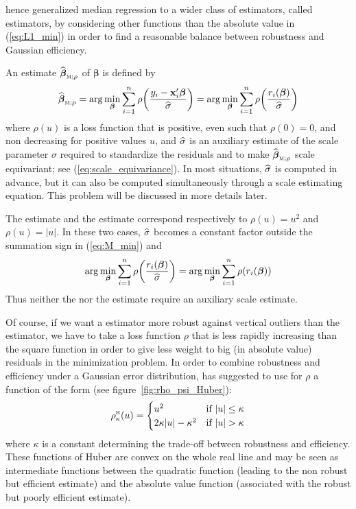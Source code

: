\citet{huber64} hence generalized median regression to a wider class of
estimators, called  estimators, by considering other functions than
the absolute value in (\ref{eq:L1_min}) in order to find a reasonable balance
between robustness and Gaussian efficiency.

An  estimate $\sthat{\boldsymbol\beta}_{\stsc{M};\rho}$ of
$\boldsymbol\beta$ is defined by
%
\begin{equation}
    \label{eq:M_min}
    \sthat{\boldsymbol\beta}_{\stsc{M};\rho} 
        = \arg\min_{\boldsymbol\beta}\sum_{i=1}^{n} 
            \rho\left(\frac{y_{i} - \stvec{x}_{i}'\boldsymbol\beta}{\sthat{\sigma}}\right)
        = \arg\min_{\boldsymbol\beta}\sum_{i=1}^{n}
            \rho\left(\frac{r_{i}(\boldsymbol\beta)}{\sthat{\sigma}}\right)
\end{equation}
%
where $\rho(u)$ is a loss function that is positive, even such that $\rho(0) =
0$, and non decreasing for positive values $u$, and $\widehat{\sigma}$ is an
auxiliary estimate of the scale parameter $\sigma$ required to standardize the
residuals and to make $\sthat{\boldsymbol\beta}_{\stsc{M};\rho}$ scale
equivariant; see (\ref{eq:scale_equivariance}). In most situations,
$\widehat{\sigma}$ is computed in advance, but it can also be computed
simultaneously through a scale  estimating equation. This problem will
be discussed in more details later.

\begin{stremark}
The  estimate and the  estimate correspond respectively to
$\rho(u) = u^{2}$ and $\rho(u) = |u|$. In these two cases, $\widehat{\sigma}$
becomes a constant factor outside the summation sign in (\ref{eq:M_min}) and
\[
    \arg\min_{\boldsymbol\beta} \sum_{i=1}^{n} \rho\left(\frac{r_{i}(\boldsymbol\beta)}{\sthat{\sigma}}\right)
    = \arg\min_{\boldsymbol\beta}\sum_{i=1}^{n}\rho(r_{i}(\boldsymbol\beta))
\]
Thus neither the  nor the  estimate require an auxiliary
scale estimate.
\end{stremark}

Of course, if we want a  estimator more robust against vertical
outliers than the  estimator, we have to take a loss function $\rho$
that is less rapidly increasing than the square function in order to give less
weight to big (in absolute value) residuals in the minimization problem. In
order to combine robustness and efficiency under a Gaussian error distribution,
\citet{huber64} has suggested to use for $\rho$ a function of the form (see
figure~\ref{fig:rho_psi_Huber}):
\[
    \rho_{\kappa}^{\stsc{H}}(u) = 
    \begin{cases}
        u^{2}                    & \text{if $|u| \leq \kappa$}\\
        2\kappa |u| - \kappa^{2} & \text{if $|u| > \kappa$}
    \end{cases}
\]
where $\kappa$ is a constant determining the trade-off between robustness and
efficiency. These functions of Huber are convex on the whole real line and may
be seen as intermediate functions between the quadratic function (leading to
the non robust but efficient  estimate) and the absolute value function
(associated with the robust but poorly efficient  estimate).

